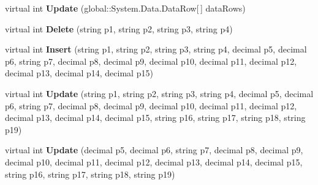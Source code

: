 \begin{DoxyCompactItemize}
\item 
virtual int {\bfseries Update} (global\+::\+System.\+Data.\+Data\+Row\mbox{[}$\,$\mbox{]} data\+Rows)\hypertarget{class_products_1_1_data_1_1ds_sage_table_adapters_1_1ta_kunden_artikel_sonderpreise_a0bef6736000002806f0c9abe03591c85}{}\label{class_products_1_1_data_1_1ds_sage_table_adapters_1_1ta_kunden_artikel_sonderpreise_a0bef6736000002806f0c9abe03591c85}

\item 
virtual int {\bfseries Delete} (string p1, string p2, string p3, string p4)\hypertarget{class_products_1_1_data_1_1ds_sage_table_adapters_1_1ta_kunden_artikel_sonderpreise_a2ae532dd0222e9e8d254a97b30ab2ba9}{}\label{class_products_1_1_data_1_1ds_sage_table_adapters_1_1ta_kunden_artikel_sonderpreise_a2ae532dd0222e9e8d254a97b30ab2ba9}

\item 
virtual int {\bfseries Insert} (string p1, string p2, string p3, string p4, decimal p5, decimal p6, string p7, decimal p8, decimal p9, decimal p10, decimal p11, decimal p12, decimal p13, decimal p14, decimal p15)\hypertarget{class_products_1_1_data_1_1ds_sage_table_adapters_1_1ta_kunden_artikel_sonderpreise_ae38389a243f65f40edc1e9676241f847}{}\label{class_products_1_1_data_1_1ds_sage_table_adapters_1_1ta_kunden_artikel_sonderpreise_ae38389a243f65f40edc1e9676241f847}

\item 
virtual int {\bfseries Update} (string p1, string p2, string p3, string p4, decimal p5, decimal p6, string p7, decimal p8, decimal p9, decimal p10, decimal p11, decimal p12, decimal p13, decimal p14, decimal p15, string p16, string p17, string p18, string p19)\hypertarget{class_products_1_1_data_1_1ds_sage_table_adapters_1_1ta_kunden_artikel_sonderpreise_a46e2ad45980fb638bee11df4e32aab46}{}\label{class_products_1_1_data_1_1ds_sage_table_adapters_1_1ta_kunden_artikel_sonderpreise_a46e2ad45980fb638bee11df4e32aab46}

\item 
virtual int {\bfseries Update} (decimal p5, decimal p6, string p7, decimal p8, decimal p9, decimal p10, decimal p11, decimal p12, decimal p13, decimal p14, decimal p15, string p16, string p17, string p18, string p19)\hypertarget{class_products_1_1_data_1_1ds_sage_table_adapters_1_1ta_kunden_artikel_sonderpreise_ac786c9ab19eb5b23a786795ed7547d5a}{}\label{class_products_1_1_data_1_1ds_sage_table_adapters_1_1ta_kunden_artikel_sonderpreise_ac786c9ab19eb5b23a786795ed7547d5a}

\end{DoxyCompactItemize}
